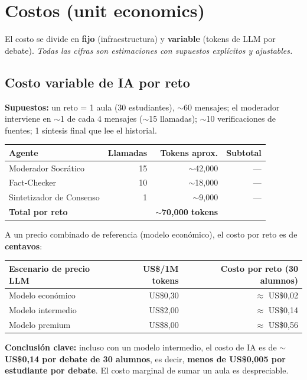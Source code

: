 \documentclass[11pt,a4paper]{article}
\newcommand{\usd}{US\$}
\begin{document}
\section{Costos (unit economics)}

El costo se divide en \textbf{fijo} (infraestructura) y \textbf{variable} (tokens de LLM por debate). \textit{Todas las cifras son estimaciones con supuestos expl\'icitos y ajustables.}

\subsection{Costo variable de IA por reto}
\textbf{Supuestos:} un reto = 1 aula (30 estudiantes), $\sim$60 mensajes; el moderador interviene en $\sim$1 de cada 4 mensajes ($\sim$15 llamadas); $\sim$10 verificaciones de fuentes; 1 s\'intesis final que lee el historial.

\begin{tabularx}{\textwidth}{@{}X r r r@{}}
\toprule
\textbf{Agente} & \textbf{Llamadas} & \textbf{Tokens aprox.} & \textbf{Subtotal} \\
\midrule
Moderador Socr\'atico & 15 & $\sim$42{,}000 & --- \\
Fact-Checker & 10 & $\sim$18{,}000 & --- \\
Sintetizador de Consenso & 1 & $\sim$9{,}000 & --- \\
\midrule
\textbf{Total por reto} & & $\sim$\textbf{70{,}000 tokens} & \\
\bottomrule
\end{tabularx}

\medskip
\noindent A un precio combinado de referencia (modelo econ\'omico), el costo por reto es de \textbf{centavos}:
\begin{tabularx}{\textwidth}{@{}X r r@{}}
\toprule
\textbf{Escenario de precio LLM} & \textbf{\usd/1M tokens} & \textbf{Costo por reto (30 alumnos)} \\
\midrule
Modelo econ\'omico & \usd 0{,}30 & $\approx$ \usd 0{,}02 \\
Modelo intermedio & \usd 2{,}00 & $\approx$ \usd 0{,}14 \\
Modelo premium & \usd 8{,}00 & $\approx$ \usd 0{,}56 \\
\bottomrule
\end{tabularx}

\medskip
\noindent\textbf{Conclusi\'on clave:} incluso con un modelo intermedio, el costo de IA es de \textbf{$\sim$\usd 0{,}14 por debate de 30 alumnos}, es decir, \textbf{menos de \usd 0{,}005 por estudiante por debate}. El costo marginal de sumar un aula es despreciable.
\end{document}
